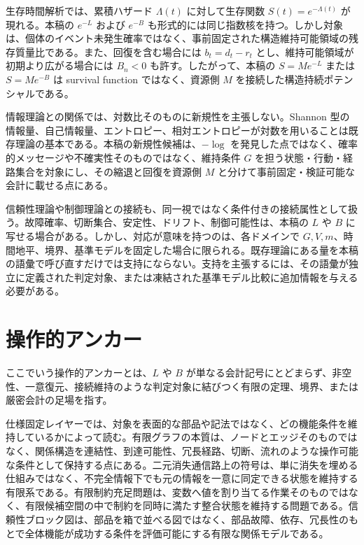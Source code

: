 \documentclass[12pt,a4paper]{article}
\begin{document}
生存時間解析では、累積ハザード \(\Lambda(t)\) に対して生存関数 \(S(t)=e^{-\Lambda(t)}\) が現れる。本稿の \(e^{-L}\) および \(e^{-B}\) も形式的には同じ指数核を持つ。しかし対象は、個体のイベント未発生確率ではなく、事前固定された構造維持可能領域の残存質量比である。また、回復を含む場合には \(b_{t}=d_{t}-r_{t}\) とし、維持可能領域が初期より広がる場合には \(B_{n}<0\) も許す。したがって、本稿の \(S=Me^{-L}\) または \(S=Me^{-B}\) は survival function ではなく、資源側 \(M\) を接続した構造持続ポテンシャルである。

情報理論との関係では、対数比そのものに新規性を主張しない。Shannon 型の情報量、自己情報量、エントロピー、相対エントロピーが対数を用いることは既存理論の基本である。本稿の新規性候補は、\(-\log\) を発見した点ではなく、確率的メッセージや不確実性そのものではなく、維持条件 \(G\) を担う状態・行動・経路集合を対象にし、その縮退と回復を資源側 \(M\) と分けて事前固定・検証可能な会計に載せる点にある。

信頼性理論や制御理論との接続も、同一視ではなく条件付きの接続属性として扱う。故障確率、切断集合、安定性、ドリフト、制御可能性は、本稿の \(L\) や \(B\) に写せる場合がある。しかし、対応が意味を持つのは、各ドメインで \(G,V,m\)、時間地平、境界、基準モデルを固定した場合に限られる。既存理論にある量を本稿の語彙で呼び直すだけでは支持にならない。支持を主張するには、その語彙が独立に定義された判定対象、または凍結された基準モデル比較に追加情報を与える必要がある。

\section{操作的アンカー}\label{ux64cdux4f5cux7684ux30a2ux30f3ux30abux30fc}

ここでいう操作的アンカーとは、\(L\) や \(B\) が単なる会計記号にとどまらず、非空性、一意復元、接続維持のような判定対象に結びつく有限の定理、境界、または厳密会計の足場を指す。

仕様固定レイヤーでは、対象を表面的な部品や記法ではなく、どの機能条件を維持しているかによって読む。有限グラフの本質は、ノードとエッジそのものではなく、関係構造を連結性、到達可能性、冗長経路、切断、流れのような操作可能な条件として保持する点にある。二元消失通信路上の符号は、単に消失を埋める仕組みではなく、不完全情報下でも元の情報を一意に同定できる状態を維持する有限系である。有限制約充足問題は、変数へ値を割り当てる作業そのものではなく、有限候補空間の中で制約を同時に満たす整合状態を維持する問題である。信頼性ブロック図は、部品を箱で並べる図ではなく、部品故障、依存、冗長性のもとで全体機能が成功する条件を評価可能にする有限な関係モデルである。
\end{document}
